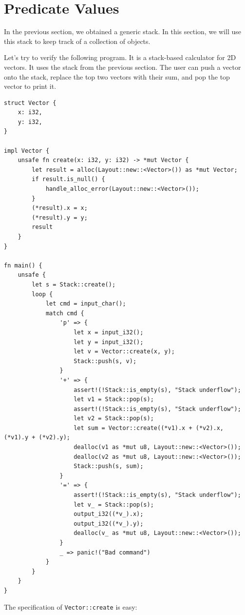 \documentclass{article}
\begin{document}
\section{Predicate Values}\label{section:predvals}

In the previous section, we obtained a generic stack. In
this section, we will use this stack to keep track of a
collection of objects.

Let's try to verify the following program. It is a stack-based
calculator for 2D vectors. It uses the stack from the previous
section. The user can push a vector onto the stack, replace the
top two vectors with their sum, and pop the top vector to print
it.

\begin{lstlisting}
struct Vector {
    x: i32,
    y: i32,
}

impl Vector {
    unsafe fn create(x: i32, y: i32) -> *mut Vector {
        let result = alloc(Layout::new::<Vector>()) as *mut Vector;
        if result.is_null() {
            handle_alloc_error(Layout::new::<Vector>());
        }
        (*result).x = x;
        (*result).y = y;
        result
    }
}

fn main() {
    unsafe {
        let s = Stack::create();
        loop {
            let cmd = input_char();
            match cmd {
                'p' => {
                    let x = input_i32();
                    let y = input_i32();
                    let v = Vector::create(x, y);
                    Stack::push(s, v);
                }
                '+' => {
                    assert!(!Stack::is_empty(s), "Stack underflow");
                    let v1 = Stack::pop(s);
                    assert!(!Stack::is_empty(s), "Stack underflow");
                    let v2 = Stack::pop(s);
                    let sum = Vector::create((*v1).x + (*v2).x, (*v1).y + (*v2).y);
                    dealloc(v1 as *mut u8, Layout::new::<Vector>());
                    dealloc(v2 as *mut u8, Layout::new::<Vector>());
                    Stack::push(s, sum);
                }
                '=' => {
                    assert!(!Stack::is_empty(s), "Stack underflow");
                    let v_ = Stack::pop(s);
                    output_i32((*v_).x);
                    output_i32((*v_).y);
                    dealloc(v_ as *mut u8, Layout::new::<Vector>());
                }
                _ => panic!("Bad command")
            }
        }
    }
}
\end{lstlisting}

The specification of \lstinline!Vector::create! is easy:
\end{document}
